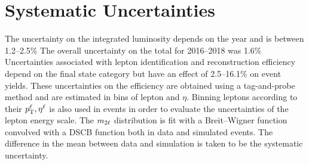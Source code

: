 \section{Systematic Uncertainties}
\label{sec:syst_uncert_dilep}
The uncertainty on the integrated luminosity depends on the year and is between 1.2--2.5\% %
The overall uncertainty on the total \lumiint for 2016--2018 was 1.6\% %
Uncertainties associated with lepton identification and reconstruction efficiency depend on the final state category but have an effect of 2.5--16.1\% on event yields.
These uncertainties on the efficiency are obtained using a tag-and-probe method and are estimated in bins of lepton \pT and $\eta$.
Binning leptons according to their $p_{\mathrm{T}}^\ell, \eta^\ell$ is also used in \ztolplm events in order to evaluate the uncertainties of the lepton energy scale.
The $m_{2\ell}$ distribution is fit with a Breit--Wigner function convolved with a DSCB function both in data and simulated events.
The difference in the mean between data and simulation is taken to be the systematic uncertainty. %


